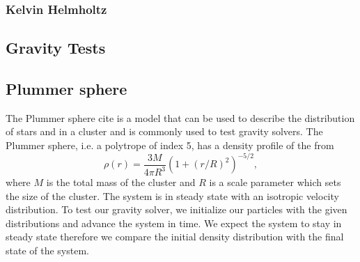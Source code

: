\subsubsection{Kelvin Helmholtz}

\subsection{Gravity Tests}
\subsection{Plummer sphere}
The Plummer sphere cite is a model that can be used to describe the distribution of stars and in a cluster
and is commonly used to test gravity solvers. The Plummer sphere, i.e. a polytrope of index 5,
has a density profile of the from
\begin{equation}
	\rho (r) = \frac{3 M}{4\pi R^3} \left(1 + (r/R)^2\right)^{-5/2},
    \label{eq.plummer}
\end{equation}
where $M$ is the total mass of the cluster and $R$ is a scale parameter which sets the
size of the cluster. The system is in steady state with an isotropic velocity distribution.
To test our gravity solver, we initialize our particles with the given distributions and
advance the system in time. We expect the system to stay in steady state therefore we compare
the initial density distribution with the final state of the system.


